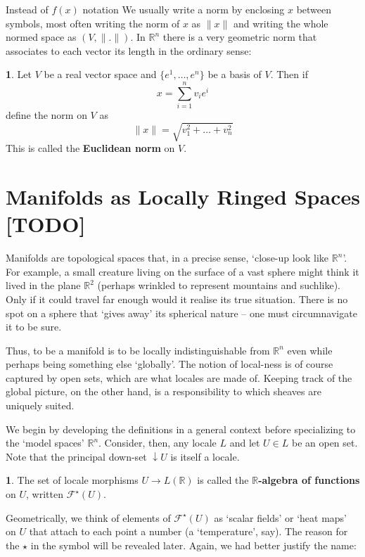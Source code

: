 \documentclass[oneside,english]{amsbook}
\numberwithin{section}{chapter}
\theoremstyle{plain}
\theoremstyle{definition}
\newtheorem{defn}[thm]{\protect\definitionname}
\providecommand{\definitionname}{Definition}
\begin{document}
Instead of $f(x)$ notation We usually write a norm by enclosing $x$ between symbols, most often writing the norm of $x$ as $\|x\|$ and writing the whole normed space as $(V,\|.\|)$. In $\mathbb{R}^n$ there is a very geometric norm that associates to each vector its length in the ordinary sense:
\begin{defn}
	Let $V$ be a real vector space and $\{e^1,\ldots,e^n\}$ be a basis of $V$. Then if 
	\[
		x = \sum_{i=1}^n v_i e^i
	\]
	define the norm on $V$ as
	\[
		\|x\| = \sqrt{v_1^2 + \ldots + v_n^2}
	\]
	This is called the \textbf{Euclidean norm} on $V$.	
\end{defn}

\section{Manifolds as Locally Ringed Spaces [TODO]}

Manifolds are topological spaces that, in a precise sense, `close-up look like $\mathbb{R}^n$'. For example, a small creature living on the surface of a vast sphere might think it lived in the plane $\mathbb{R}^2$ (perhaps wrinkled to represent mountains and suchlike). Only if it could travel far enough would it realise its true situation. There is no spot on a sphere that `gives away' its spherical nature -- one must circumnavigate it to be sure. 

Thus, to be a manifold is to be locally indistinguishable from $\mathbb{R}^n$ even while perhaps being something else `globally'. The notion of local-ness is of course captured by open sets, which are what locales are made of. Keeping track of the global picture, on the other hand, is a responsibility to which sheaves are uniquely suited.

We begin by developing the definitions in a general context before specializing to the `model spaces' $\mathbb{R}^n$. Consider, then, any locale $L$ and let $U\in L$ be an open set. Note that the principal down-set $\downarrow U$ is itself a locale. 

\begin{defn}
	The set of locale morphisms $U\to L(\mathbb{R})$ is called the \textbf{$\mathbb{R}$-algebra of functions} on $U$, written $\mathscr{F}^\star(U)$.
\end{defn}

Geometrically, we think of elements of $\mathscr{F}^\star(U)$ as `scalar fields' or `heat maps' on $U$ that attach to each point a number (a `temperature', say). The reason for the $\star$ in the symbol will be revealed later. Again, we had better justify the name:
\end{document}
